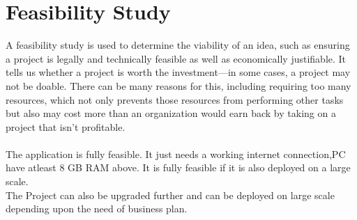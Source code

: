 \section{Feasibility Study}
A feasibility study is used to determine the viability of an idea, such as ensuring a project is legally and technically feasible as well as economically justifiable. It tells us whether a project is worth the investment—in some cases, a project may not be doable. There can be many reasons for this, including requiring too many resources, which not only prevents those resources from performing other tasks but also may cost more than an organization would earn back by taking on a project that isn’t profitable.\\
\\
The application is fully feasible. It just needs a working internet connection,PC have atleast 8 GB RAM above. It is fully feasible if it is also deployed on a large scale.\\
The Project can also be upgraded further and can be deployed on large scale depending upon the need of business plan.\\
